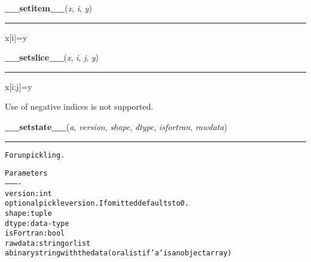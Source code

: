     \begin{boxedminipage}{\textwidth}

    \raggedright \textbf{\_\_setitem\_\_}(\textit{x}, \textit{i}, \textit{y})

    \vspace{-1.5ex}

    \rule{\textwidth}{0.5\fboxrule}

x{[}i{]}=y
    \vspace{1ex}

    \end{boxedminipage}

    \label{numpy:ndarray:__setslice__}

    \vspace{0.5ex}

    \begin{boxedminipage}{\textwidth}

    \raggedright \textbf{\_\_setslice\_\_}(\textit{x}, \textit{i}, \textit{j}, \textit{y})

    \vspace{-1.5ex}

    \rule{\textwidth}{0.5\fboxrule}

x{[}i:j{]}=y

Use  of negative indices is not supported.
    \vspace{1ex}

    \end{boxedminipage}

    \label{numpy:ndarray:__setstate__}

    \vspace{0.5ex}

    \begin{boxedminipage}{\textwidth}

    \raggedright \textbf{\_\_setstate\_\_}(\textit{a}, \textit{version}, \textit{shape}, \textit{dtype}, \textit{isfortran}, \textit{rawdata})

    \vspace{-1.5ex}

    \rule{\textwidth}{0.5\fboxrule}
\begin{alltt}
For unpickling.

Parameters
----------
version : int
    optional pickle version. If omitted defaults to 0.
shape : tuple
dtype : data-type
isFortran : bool
rawdata : string or list
    a binary string with the data (or a list if 'a' is an object array)
\end{alltt}

    \vspace{1ex}

    \end{boxedminipage}


